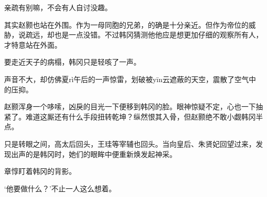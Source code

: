 亲疏有别嘛，不会有人自讨没趣。

其实赵颢也站在外围。作为一母同胞的兄弟，的确是十分亲近。但作为帝位的威胁，说疏远，却也是一点没错。不过韩冈猜测他他应是想更加仔细的观察所有人，才特意站在外面。

要走近天子的病榻，韩冈只是轻咳了一声。

声音不大，却仿佛夏rì午后的一声惊雷，划破被yīn云遮蔽的天空，震散了空气中的压抑。

赵颢浑身一个哆嗦，凶戾的目光一下便移到韩冈的脸。眼神惊疑不定，心也一下抽紧了。难道这厮还有什么手段扭转乾坤？纵然恨其入骨，但赵颢绝不敢小觑韩冈半点。

只是转眼之间，高太后回头，王珪等宰辅也回头。当向皇后、朱贤妃回望过来，发现出声的是韩冈时，她们的眼眸中便重新焕发起神采。

章惇盯着韩冈的背影。

‘他要做什么？’不止一人这么想着。
